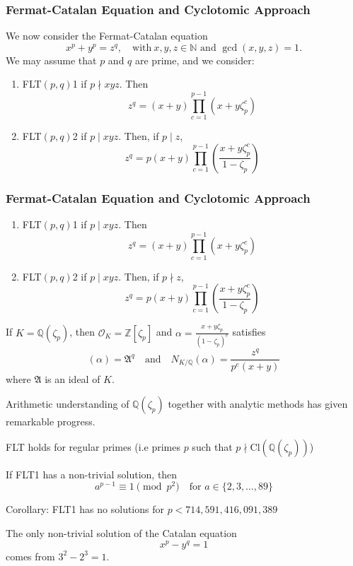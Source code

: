 \documentclass{beamer}
\newcommand{\NN}{\mathbb{N}}
\newcommand{\QQ}{\mathbb{Q}}
\newcommand{\ZZ}{\mathbb{Z}}
\theoremstyle{plain}
\begin{document}
\begin{frame}
    \frametitle{Fermat-Catalan Equation and Cyclotomic Approach}
    We now consider the Fermat-Catalan equation
    $$x^p+y^p=z^q,\quad\text{with}\ x,y,z\in\NN\text{ and }\gcd(x,y,z)=1.$$
    We may assume that $p$ and $q$ are prime, and we consider:
    \begin{enumerate}
        \item FLT$(p,q)$1 if $p\nmid xyz$. Then
        $$z^q=(x+y)\prod_{c=1}^{p-1}(x+y\zeta_p^c)$$
        \item FLT$(p,q)$2 if $p\mid xyz$. Then, if $p\mid z$,
        $$z^q=p(x+y)\prod_{c=1}^{p-1}\left(\frac{x+y\zeta_p^c}{1-\zeta_p}\right)$$
    \end{enumerate}

\end{frame}


\begin{frame}
    \frametitle{Fermat-Catalan Equation and Cyclotomic Approach}
    \begin{enumerate}
        \item FLT$(p,q)$1 if $p\mid xyz$. Then
        $$z^q=(x+y)\prod_{c=1}^{p-1}(x+y\zeta_p^c)$$
        \item FLT$(p,q)$2 if $p\mid xyz$. Then, if $p\nmid z$,
        $$z^q=p(x+y)\prod_{c=1}^{p-1}\left(\frac{x+y\zeta_p^c}{1-\zeta_p}\right)$$
    \end{enumerate}
    If $K=\QQ(\zeta_p)$, then $\mathcal{O}_K=\ZZ[\zeta_p]$ and $\alpha=\frac{x+y\zeta_p}{(1-\zeta_p)^e}$ satisfies 
    \begin{equation}
        (\alpha)=\mathfrak{A}^q\quad\text{and}\quad N_{K/\QQ}(\alpha)=\frac{z^q}{p^e(x+y)}
    \end{equation}
    where $\mathfrak{A}$ is an ideal of $K$.
\end{frame}

\begin{frame}
    Arithmetic understanding of $\QQ(\zeta_p)$ together with analytic methods has given remarkable progress.
    \begin{theorem}[Kummer]
        FLT holds for regular primes (i.e primes $p$ such that $p\nmid \mathrm{Cl}(\QQ(\zeta_p))$)        
    \end{theorem} 
    \begin{theorem}
        If FLT1 has a non-trivial solution, then 
        $$a^{p-1}\equiv1\pmod{p^2}\quad\text{for }a\in\{2,3,\ldots,89\}$$        
    \end{theorem}
    Corollary: FLT1 has no solutions for $p<714,591,416,091,389$
    \begin{theorem}[Mihailescu, 2001]
        The only non-trivial solution of the Catalan equation
        $$x^p-y^q=1$$
        comes from $3^2-2^3=1$.
    \end{theorem}

\end{frame}
\end{document}
